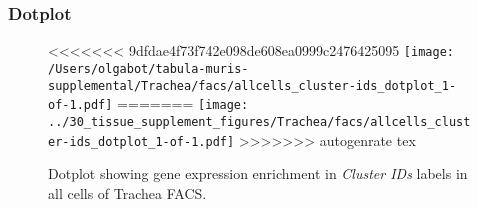 \clearpage

\subsubsection{Dotplot}
\begin{figure}[h]
\centering
<<<<<<< 9dfdae4f73f742e098de608ea0999c2476425095
\texttt{[image: /Users/olgabot/tabula-muris-supplemental/Trachea/facs/allcells\_cluster-ids\_dotplot\_1-of-1.pdf]}
=======
\texttt{[image: ../30\_tissue\_supplement\_figures/Trachea/facs/allcells\_cluster-ids\_dotplot\_1-of-1.pdf]}
>>>>>>> autogenrate tex

\caption{ Dotplot  showing gene expression enrichment in \emph{Cluster IDs} labels in all cells of Trachea FACS. }
\end{figure}

